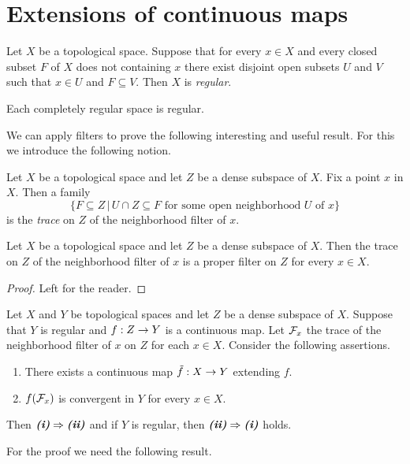 \documentclass[10pt]{amsart}
\begin{document}
\section{Extensions of continuous maps}

\begin{definition}
	Let $X$ be a topological space. Suppose that for every $x \in X$ and every closed subset $F$ of $X$ does not containing $x$ there exist disjoint open subsets $U$ and $V$ such that $x \in U$ and $F \subseteq V$. Then $X$ is \textit{regular}.  
\end{definition}

\begin{corollary}\label{corollary:completely_regular_space_is_regular}
	Each completely regular space is regular.
\end{corollary}
\noindent
We can apply filters to prove the following interesting and useful result. For this we introduce the following notion.

\begin{definition}
	Let $X$ be a topological space and let $Z$ be a dense subspace of $X$. Fix a point $x$ in $X$. Then a family
	$$\big\{F\subseteq Z\,\big|\,U\cap Z\subseteq F\mbox{ for some open neighborhood }U\mbox{ of }x\big\}$$
is the \textit{trace} on $Z$ of the neighborhood filter of $x$. 
\end{definition}

\begin{fact}\label{fact:trace_is_proper_filter}
	Let $X$ be a topological space and let $Z$ be a dense subspace of $X$. Then the trace on $Z$ of the neighborhood filter of $x$ is a proper filter on $Z$ for every $x \in X$.   
\end{fact}
\begin{proof}
	Left for the reader.
\end{proof}

\begin{theorem}\label{theorem:extension_of_continuous_map_from_dense_subspace}
	Let $X$ and $Y$ be topological spaces and let $Z$ be a dense subspace of $X$. Suppose that $Y$ is regular and $f:Z\rightarrow Y$ is a continuous map. Let ${\mathcal F}_x$ the trace of the neighborhood filter of $x$ on $Z$ for each $x \in X$. Consider the following assertions.
	\begin{enumerate}[label=\emph{\textbf{(\roman*)}}, leftmargin=*]
		\item There exists a continuous map $\tilde{f}:X\rightarrow Y$ extending $f$.  
		\item $f({\mathcal F}_x)$ is convergent in $Y$ for every $x\in X$. 
	\end{enumerate}
	Then $\emph{\textbf{(i)}}\Rightarrow \emph{\textbf{(ii)}}$ and if $Y$ is regular, then $\emph{\textbf{(ii)}} \Rightarrow \emph{\textbf{(i)}}$ holds.
\end{theorem}
\noindent
For the proof we need the following result.
\end{document}

